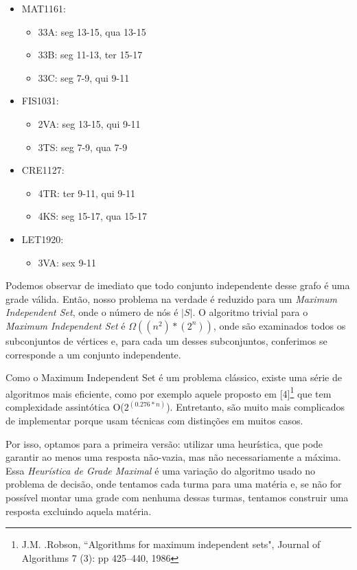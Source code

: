 \documentclass[graduacao,brazil]{ThesisPUC}
\begin{document}
\begin{itemize}
	\item MAT1161:
	\begin{itemize}
		\item 33A: seg 13-15, qua 13-15
		\item 33B: seg 11-13, ter 15-17
		\item 33C: seg 7-9, qui 9-11
	\end{itemize}

	\item FIS1031:
	\begin{itemize}
		\item 2VA: seg 13-15, qui 9-11
		\item 3TS: seg 7-9, qua 7-9
	\end{itemize}

	\item CRE1127:
	\begin{itemize}
		\item 4TR: ter 9-11, qui 9-11
		\item 4KS: seg 15-17, qua 15-17
	\end{itemize}

	\item LET1920:
	\begin{itemize}
		\item 3VA: sex 9-11
	\end{itemize}
\end{itemize}

Podemos observar de imediato que todo conjunto independente desse grafo é uma grade válida. Então, nosso problema na verdade é reduzido para um \textit{Maximum Independent Set}, onde o número de nós é $|S|$. O algoritmo trivial para o \textit{Maximum Independent Set} é $\Omega((n^2)*(2^n))$, onde são examinados todos os subconjuntos de vértices e, para cada um desses subconjuntos, conferimos se corresponde a um conjunto independente.

Como o Maximum Independent Set é um problema clássico, existe uma série de algoritmos mais eficiente, como por exemplo aquele proposto em [4]\footnote{J.M. .Robson, “Algorithms for maximum independent sets", Journal of Algorithms 7 (3): pp 425–440, 1986} que tem complexidade assintótica O($2^{(0.276*n)}$). Entretanto, são muito mais complicados de implementar porque usam técnicas com distinções em muitos casos.

Por isso, optamos para a primeira versão: utilizar uma heurística, que pode garantir ao menos uma resposta não-vazia, mas não necessariamente a máxima. Essa \textit{Heurística de Grade Maximal} é uma variação do algoritmo usado no problema de decisão, onde tentamos cada turma para uma matéria e, se não for possível montar uma grade com nenhuma dessas turmas, tentamos construir uma resposta excluindo aquela matéria.
\end{document}
